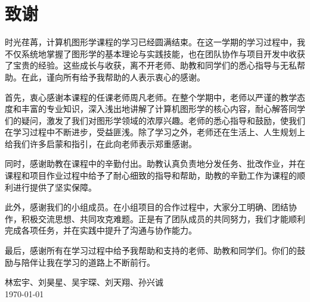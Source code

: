 
\chapter{致谢}

时光荏苒，计算机图形学课程的学习已经圆满结束。在这一学期的学习过程中，我不仅系统地掌握了图形学的基本理论与实践技能，也在团队协作与项目开发中收获了宝贵的经验。这些成长与收获，离不开老师、助教和同学们的悉心指导与无私帮助。在此，谨向所有给予我帮助的人表示衷心的感谢。

首先，衷心感谢本课程的任课老师周凡老师。在整个学期中，老师以严谨的教学态度和丰富的专业知识，深入浅出地讲解了计算机图形学的核心内容，耐心解答同学们的疑问，激发了我们对图形学领域的浓厚兴趣。老师的悉心指导和鼓励，使我们在学习过程中不断进步，受益匪浅。除了学习之外，老师还在生活上、人生规划上给我们许多启蒙和指引，在此向老师表示郑重感谢。

同时，感谢助教在课程中的辛勤付出。助教认真负责地分发任务、批改作业，并在课程和项目作业过程中给予了耐心细致的指导和帮助，助教的辛勤工作为课程的顺利进行提供了坚实保障。

此外，感谢我们的小组成员。在小组项目的合作过程中，大家分工明确、团结协作，积极交流思想、共同攻克难题。正是有了团队成员的共同努力，我们才能顺利完成各项任务，并在实践中提升了沟通与协作能力。

最后，感谢所有在学习过程中给予我帮助和支持的老师、助教和同学们。你们的鼓励与陪伴让我在学习的道路上不断前行。

\vskip 108pt
\begin{flushright}
    林宏宇、刘昊星、吴宇琛、刘天翔、孙兴诚\makebox[1cm]{} \\
    \today
\end{flushright}
